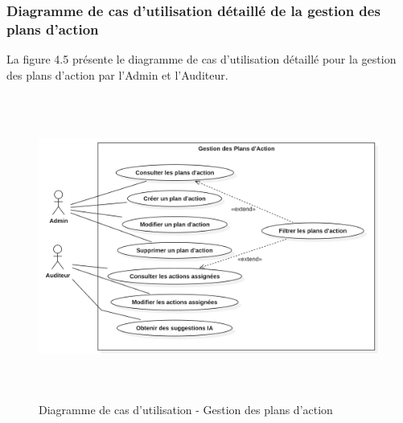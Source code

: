 \subsubsection{Diagramme de cas d'utilisation détaillé de la gestion des plans d'action}
\noindent La figure 4.5 présente le diagramme de cas d'utilisation détaillé pour la gestion des plans d'action par l'Admin et l'Auditeur.

\begin{figure}[H]
    \centering
    \includegraphics[width=14cm,height=10cm]{images/actionplansuc.png}
    \caption{Diagramme de cas d'utilisation - Gestion des plans d'action}
\end{figure}


